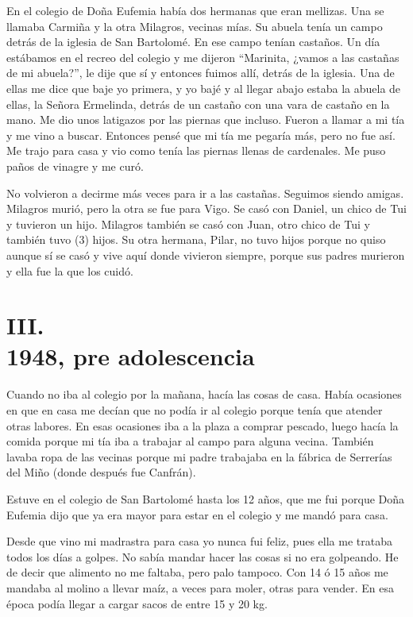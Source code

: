\documentclass[12pt,a5paper]{book}
\begin{document}
En el colegio de Doña Eufemia había dos hermanas que eran mellizas. Una se llamaba Carmiña y la otra Milagros, vecinas mías. Su abuela tenía un campo detrás de la iglesia de San Bartolomé. En ese campo tenían castaños. Un día estábamos en el recreo del colegio y me dijeron “Marinita, ¿vamos a las castañas de mi abuela?”, le dije que sí y entonces fuimos allí, detrás de la iglesia. Una de ellas me dice que baje yo primera, y yo bajé y al llegar abajo estaba la abuela de ellas, la Señora Ermelinda, detrás de un castaño con una vara de castaño en la mano. Me dio unos latigazos por las piernas que incluso. Fueron a llamar a mi tía y me vino a buscar. Entonces pensé que mi tía me pegaría más, pero no fue así. Me trajo para casa y vio como tenía las piernas llenas de cardenales. Me puso paños de vinagre y me curó.

No volvieron a decirme más veces para ir a las castañas. Seguimos siendo amigas. Milagros murió, pero la otra se fue para Vigo. Se casó con Daniel, un chico de Tui y tuvieron un hijo. Milagros también se casó con Juan, otro chico de Tui y también tuvo (3) hijos. Su otra hermana, Pilar, no tuvo hijos porque no quiso aunque sí se casó y vive aquí donde vivieron siempre, porque sus padres murieron y ella fue la que los cuidó.



\section*{III.\\1948, pre adolescencia}

Cuando no iba al colegio por la mañana, hacía las cosas de casa. Había ocasiones en que en casa me decían que no podía ir al colegio porque tenía que atender otras labores. En esas ocasiones iba a la plaza a comprar pescado, luego hacía la comida porque mi tía iba a trabajar al campo para alguna vecina. También lavaba ropa de las vecinas porque mi padre trabajaba en la fábrica de Serrerías del Miño (donde después fue Canfrán). 

Estuve en el colegio de San Bartolomé hasta los 12 años, que me fui porque Doña Eufemia dijo que ya era mayor para estar en el colegio y me mandó para casa.

Desde que vino mi madrastra para casa yo nunca fui feliz, pues ella me trataba todos los días a golpes. No sabía mandar hacer las cosas si no era golpeando. He de decir que alimento no me faltaba, pero palo tampoco.
Con 14 ó 15 años me mandaba al molino a llevar maíz, a veces para moler, otras para vender. En esa época podía llegar a cargar sacos de entre 15 y 20 kg.
\end{document}
